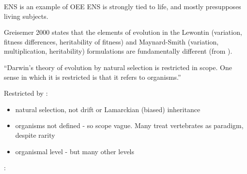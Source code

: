 ENS is an example of OEE
ENS is strongly tied to life, and mostly presupposes living subjects.

Greisemer 2000 states that the elements of evolution in the Lewontin (variation, fitness differences, heritability of fitness) and Maynard-Smith (variation, multiplication, heritability) formulations are fundamentally different (from \autocite{Vasas2015}).


``Darwin's theory of evolution by natural selection is restricted in scope. One sense in which it is restricted is that it refers to organisms.'' \autocite{Griesemer2005}

Restricted by \autocite{Griesemer2005}:
\begin{itemize}
	\item natural selection, not drift or Lamarckian (biased) inheritance
	\item organisms not defined - so scope vague. Many treat vertebrates as paradigm, despite rarity
	\item organismal level - but many other levels
\end{itemize}


\autocite{Godfrey-Smith2007}:

